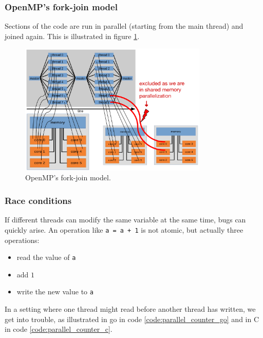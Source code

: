 \subsubsection{OpenMP's fork-join model}
Sections of the code are run in parallel (starting from the main thread) and joined again.
This is illustrated in figure \ref{fig:fork_join}.

\begin{figure}[!htb]
    \centering
    \includegraphics[width=0.8\textwidth]{figures/fork_join.png}
    \caption{OpenMP's fork-join model.}
    \label{fig:fork_join}
\end{figure}

\subsubsection{Race conditions}
If different threads can modify the same variable at the same time, bugs can quickly arise.
An operation like \texttt{a = a + 1} is not atomic, but actually three operations:
\begin{itemize}
    \item read the value of \texttt{a}
    \item add $1$
    \item write the new value to \texttt{a}
\end{itemize}
In a setting where one thread might read before another thread has written, we get into trouble,
as illustrated in go in code \ref{code:parallel_counter_go} and in C in code \ref{code:parallel_counter_c}.

